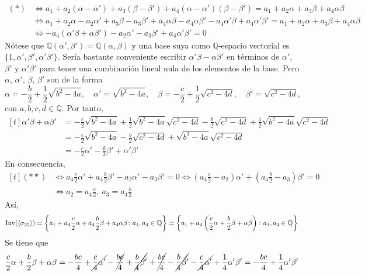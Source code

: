 \documentclass[11pt]{report}
\makeatletter
\renewenvironment{proof}[1][\proofname]{\par
  \pushQED{\qed}%
  \normalfont \topsep\z@skip %
  \trivlist
  \item[\hskip\labelsep
        \itshape
    #1\@addpunct{.}]\ignorespaces
}{%
  \popQED\endtrivlist\@endpefalse
}
\newcommand{\Q}{\mathbb Q}
\makeatother
\begin{document}
\begin{proof}
\begin{enumerate}
    \begin{align*} 
        (*) &\iff a_{1}+a_{2}(\alpha-\alpha') +a_{3}(\beta-\beta')+a_4(\alpha-\alpha')(\beta-\beta') = a_{1}+a_{2}\alpha +a_{3}{\beta}+a_4\alpha{\beta}
        \\ &\iff a_1+a_2\alpha-a_2\alpha'+a_3\beta-a_3\beta'+a_4\alpha\beta -a_4\alpha\beta'-a_4\alpha'\beta+a_4\alpha'\beta' = a_{1}+a_{2}\alpha +a_{3}{\beta}+a_4\alpha{\beta}
        \\ &\iff -a_4(\alpha'\beta+\alpha\beta') -a_2\alpha'-a_3\beta'+a_4\alpha'\beta' =0 \tag{$\ast\ast$}
    \end{align*}
    Nótese que $\Q(\alpha',\beta') = \Q(\alpha,\beta)$ y una base suya como $\Q$-espacio vectorial es $\{1,\alpha',\beta',\alpha'\beta'\}$. Sería bastante conveniente escribir $\alpha'\beta - \alpha\beta'$ en términos de $\alpha'$, $\beta'$ y $\alpha'\beta'$ para tener una combinación lineal nula de los elementos de la base. Pero $\alpha$, $\alpha'$, $\beta$, $\beta'$ son de la forma
    \[\alpha = -\frac{b}{2}+\frac{1}{2}\sqrt{b^2-4a}, \quad \alpha' = \sqrt{b^2-4a}, \quad  \beta = -\frac{c}{2}+\frac{1}{2}\sqrt{c^2-4d}, \quad \beta' = \sqrt{c^2-4d},\]
    con $a,b,c,d \in \Q$. Por tanto,
    \[\begin{aligned}[t]\alpha'\beta + \alpha\beta' &= -\frac{c}{2}\sqrt{b^2-4a}+\frac{1}{2}\sqrt{b^2-4a}\sqrt{c^2-4d}-\frac{b}{2}\sqrt{c^2-4d}+\frac{1}{2}\sqrt{b^2-4a}\sqrt{c^2-4d} \\
    &= -\frac{c}{2}\sqrt{b^2-4a}-\frac{b}{2}\sqrt{c^2-4d}+\sqrt{b^2-4a}\sqrt{c^2-4d} \\
    &= -\frac{c}{2}\alpha'- \frac{b}{2}\beta'+\alpha'\beta'
    \end{aligned}\]
    En consecuencia,
    \[\begin{aligned}[t]
        (\ast\ast) &\iff a_4\frac{c}{2}\alpha'+a_4\frac{b}{2} \beta'-a_2\alpha'-a_3\beta' =0 \iff \left(a_4\frac{c}{2}-a_2\right)\alpha'+\left(a_4\frac{b}{2}-a_3\right)\beta'=0
        \\ &\iff a_2 = a_4\frac{c}{2}, \ a_3 = a_4\frac{b}{2}
    \end{aligned}
    \]
    Así,
    \[\begin{aligned}[t]
        \textup{Inv}(\langle\sigma_{22} \rangle) = \left\{a_1+a_4\frac{c}{2}\alpha+a_4\frac{b}{2}\beta+a_4\alpha\beta \colon a_1,a_4 \in \Q\right\} = \left\{a_1+a_4\left(\frac{c}{2}\alpha+\frac{b}{2}\beta+\alpha\beta\right) \colon a_1,a_4 \in \Q\right\}
    \end{aligned}\]
    Se tiene que
    \[\frac{c}{2}\alpha+\frac{b}{2}\beta+\alpha\beta = -\frac{bc}{4}+\cancel{\frac{c}{4}\alpha'}-\cancel{\frac{bc}{4}}+\cancel{\frac{b}{4}\beta'}+\cancel{\frac{bc}{4}}-\cancel{\frac{b}{4}\beta'}-\cancel{\frac{c}{4}\alpha'}+\frac{1}{4}\alpha'\beta' =-\frac{bc}{4}+\frac{1}{4}\alpha'\beta'\]

\end{enumerate}
\end{proof}
\end{document}
